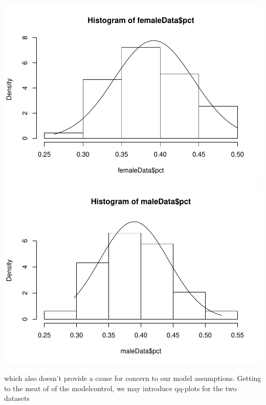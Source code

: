 \documentclass[
]{article}
\newenvironment{Shaded}{\begin{snugshade}}{\end{snugshade}}
\newcommand{\DataTypeTok}[1]{\textcolor[rgb]{0.13,0.29,0.53}{#1}}
\newcommand{\KeywordTok}[1]{\textcolor[rgb]{0.13,0.29,0.53}{\textbf{#1}}}
\newcommand{\NormalTok}[1]{#1}
\newcommand{\OperatorTok}[1]{\textcolor[rgb]{0.81,0.36,0.00}{\textbf{#1}}}
\newcommand{\StringTok}[1]{\textcolor[rgb]{0.31,0.60,0.02}{#1}}
\begin{document}
\includegraphics[width=0.5\linewidth]{matstatproblems20-21_files/figure-latex/unnamed-chunk-20-1}
\includegraphics[width=0.5\linewidth]{matstatproblems20-21_files/figure-latex/unnamed-chunk-20-2}

which also doesn't provide a cause for concern to our model assumptions.
Getting to the meat of of the modelcontrol, we may introduce qq-plots
for the two datasets

\begin{Shaded}
\end{Shaded}
\end{document}
